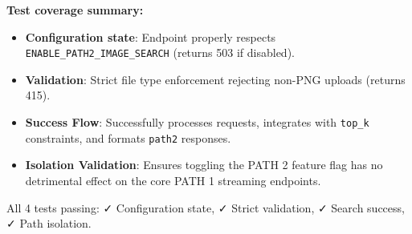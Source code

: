 \textbf{Test coverage summary:}
\begin{itemize}
    \item \textbf{Configuration state}: Endpoint properly respects \texttt{ENABLE\_PATH2\_IMAGE\_SEARCH} (returns 503 if disabled).
    \item \textbf{Validation}: Strict file type enforcement rejecting non-PNG uploads (returns 415).
    \item \textbf{Success Flow}: Successfully processes requests, integrates with \texttt{top\_k} constraints, and formats \texttt{path2} responses.
    \item \textbf{Isolation Validation}: Ensures toggling the PATH 2 feature flag has no detrimental effect on the core PATH 1 streaming endpoints.
\end{itemize}

All 4 tests passing: ✓ Configuration state, ✓ Strict validation, ✓ Search success, ✓ Path isolation.

